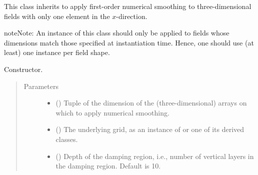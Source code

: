\documentclass[letterpaper,10pt,english]{sphinxmanual}
\begin{document}
\begin{fulllineitems}
\label{\detokenize{api:tasmania.dycore.horizontal_smoothing.HorizontalSmoothingFirstOrderYZ}}
This class inherits {\hyperref[\detokenize{api:tasmania.dycore.horizontal_smoothing.HorizontalSmoothing}]{}} to apply first-order
numerical smoothing to three-dimensional fields with only one element in the \(x\)-direction.

\begin{sphinxadmonition}{note}{Note:}
An instance of this class should only be applied to fields whose dimensions match those specified at instantiation time.
Hence, one should use (at least) one instance per field shape.
\end{sphinxadmonition}

\begin{fulllineitems}
\label{\detokenize{api:tasmania.dycore.horizontal_smoothing.HorizontalSmoothingFirstOrderYZ.__init__}}
Constructor.
\begin{quote}\begin{description}
\item[{Parameters}] \leavevmode\begin{itemize}
\item {} 
 () \textendash{} Tuple of the dimension of the (three-dimensional) arrays on which to apply numerical smoothing.

\item {} 
 () \textendash{} The underlying grid, as an instance of {\hyperref[\detokenize{api:tasmania.grids.grid_xyz.GridXYZ}]{}} or one of its derived classes.

\item {} 
 () \textendash{} Depth of the damping region, i.e., number of vertical layers in the damping region. Default is 10.


\end{itemize}
\end{description}
\end{quote}
\end{fulllineitems}
\end{fulllineitems}
\end{document}
